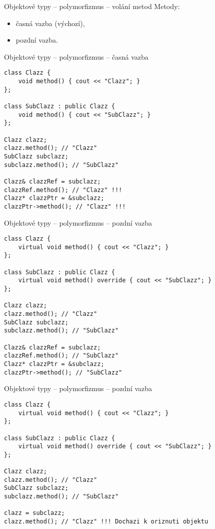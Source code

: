 \begin{frame}[fragile]
\begin{block}{Objektové typy -- polymorfizmus -- volání metod}
Metody:
\begin{itemize}
\item časná vazba (výchozí),
\item pozdní vazba.
\end{itemize} 
\end{block}
\end{frame}


\begin{frame}[fragile]
\begin{exampleblock}{Objektové typy -- polymorfizmus -- časná vazba} 
\begin{lstlisting}
class Clazz {
	void method() { cout << "Clazz"; }
};

class SubClazz : public Clazz { 
	void method() { cout << "SubClazz"; }
};

Clazz clazz;
clazz.method(); // "Clazz"
SubClazz subclazz;
subclazz.method(); // "SubClazz"

Clazz& clazzRef = subclazz;
clazzRef.method(); // "Clazz" !!!
Clazz* clazzPtr = &subclazz;
clazzPtr->method(); // "Clazz" !!!
\end{lstlisting}
\end{exampleblock}
\end{frame}

\begin{frame}[fragile]
\begin{exampleblock}{Objektové typy -- polymorfizmus -- pozdní vazba} 
\begin{lstlisting}
class Clazz {
	virtual void method() { cout << "Clazz"; }
};

class SubClazz : public Clazz { 
	virtual void method() override { cout << "SubClazz"; }
};

Clazz clazz;
clazz.method(); // "Clazz"
SubClazz subclazz;
subclazz.method(); // "SubClazz"

Clazz& clazzRef = subclazz;
clazzRef.method(); // "SubClazz"
Clazz* clazzPtr = &subclazz;
clazzPtr->method(); // "SubClazz"
\end{lstlisting}
\end{exampleblock}
\end{frame}


\begin{frame}[fragile]
\begin{exampleblock}{Objektové typy -- polymorfizmus -- pozdní vazba} 
\begin{lstlisting}
class Clazz {
	virtual void method() { cout << "Clazz"; }
};

class SubClazz : public Clazz { 
	virtual void method() override { cout << "SubClazz"; }
};

Clazz clazz;
clazz.method(); // "Clazz"
SubClazz subclazz;
subclazz.method(); // "SubClazz"

clazz = subclazz;
clazz.method(); // "Clazz" !!! Dochazi k oriznuti objektu
\end{lstlisting}
\end{exampleblock}
\end{frame}



